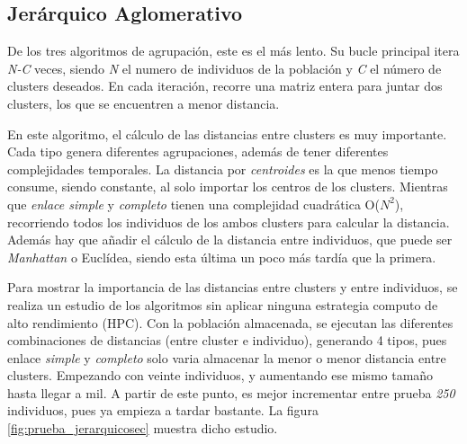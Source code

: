 

	\subsection{Jerárquico Aglomerativo}
	
		De los tres algoritmos de agrupación, este es el más lento. Su bucle principal itera \textit{N-C} veces, siendo \textit{N} el numero de individuos de la población y \textit{C} el número de clusters deseados. En cada iteración, recorre una matriz entera para juntar dos clusters, los que se encuentren a menor distancia. 
		
		
		En este algoritmo, el cálculo de las distancias entre clusters es muy importante. Cada tipo genera diferentes agrupaciones, además de tener diferentes complejidades temporales. La distancia por \textit{centroides} es la que menos tiempo consume, siendo constante, al solo importar los centros de los clusters. Mientras que \textit{enlace simple} y \textit{completo} tienen una complejidad cuadrática O(\(N^{2}\)), recorriendo todos los individuos de los ambos clusters para calcular la distancia. Además hay que añadir el cálculo de la distancia entre individuos, que puede ser \textit{Manhattan} o Euclídea, siendo esta última un poco más tardía que la primera.
		

		Para mostrar la importancia de las distancias entre clusters y entre individuos, se realiza un estudio de los algoritmos sin aplicar ninguna estrategia computo de alto rendimiento (HPC). Con la población almacenada, se ejecutan las diferentes combinaciones de distancias (entre cluster e individuo), generando 4 tipos, pues enlace \textit{simple} y \textit{completo} solo varia almacenar la menor o menor distancia entre clusters. Empezando con veinte individuos, y aumentando ese mismo tamaño hasta llegar a mil. A partir de este punto, es mejor incrementar entre prueba \textit{250} individuos, pues ya empieza a tardar bastante. La figura \ref{fig:prueba_jerarquicosec} muestra dicho estudio. 
		
